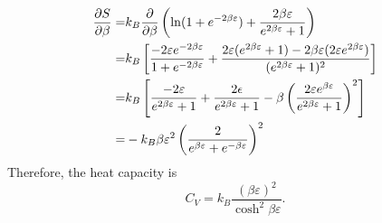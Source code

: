     \begin{align}
        \frac{\partial S}{\partial \beta} =& k_B\frac{\partial }{\partial \beta}\left( \ln(1+e^{-2\beta\varepsilon})+\frac{2\beta\varepsilon}{e^{2\beta\varepsilon}+1} \right) \notag\\
        =& k_B\left[ \frac{-2\varepsilon e^{-2\beta\varepsilon}}{1+e^{-2\beta\varepsilon}}+\frac{2\varepsilon(e^{2\beta\varepsilon}+1)-2\beta\varepsilon(2\varepsilon e^{2\beta\varepsilon})}{(e^{2\beta\varepsilon}+1)^2} \right]\notag\\
        =& k_B\left[ \frac{-2\varepsilon}{e^{2\beta\varepsilon}+1}+\frac{2\epsilon}{e^{2\beta\varepsilon}+1}-\beta\left( \frac{2\varepsilon e^{\beta\varepsilon}}{e^{2\beta\varepsilon}+1} \right)^2 \right]\notag\\
        =& -k_B\beta\varepsilon^2\left( \frac{2}{e^{\beta\varepsilon}+e^{-\beta\varepsilon}} \right)^2
    \end{align}
    Therefore, the heat capacity is
    \begin{equation}
        C_V = k_B\frac{(\beta\varepsilon)^2}{\cosh^2\beta\varepsilon}.
    \end{equation}
